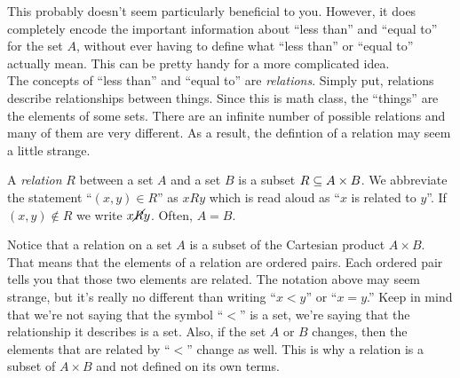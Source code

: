This probably doesn't seem particularly beneficial to you.  However, it does completely encode the important information about ``less than'' and ``equal to'' for the set $A$, without ever having to define what ``less than'' or ``equal to'' actually mean.  This can be pretty handy for a more complicated idea.\\

The concepts of ``less than'' and ``equal to'' are \textit{relations}.  Simply put, relations describe relationships between things.  Since this is math class, the ``things'' are the elements of some sets.  There are an infinite number of possible relations and many of them are very different.  As a result, the defintion of a relation may seem a little strange.

\begin{definition}[Relation]  A \textit{relation} $R$ between a set $A$ and a set $B$ is a subset $R \subseteq A \times B$.  We abbreviate the statement ``$(x,y) \in R$'' as $x R y$ which is read aloud as ``$x$ is related to $y$''.  If $(x,y) \notin R$ we write $x \cancel{R} y$.  Often, $A=B$.
\end{definition}

Notice that a relation on a set $A$ is a subset of the Cartesian product $A \times B$.  That means that the elements of a relation are ordered pairs.  Each ordered pair tells you that those two elements are related.  The notation above may seem strange, but it's really no different than writing ``$x<y$'' or ``$x=y$.''  Keep in mind that we're not saying that the symbol ``$<$'' is a set, we're saying that the relationship it describes is a set.  Also, if the set $A$ or $B$ changes, then the elements that are related by ``$<$'' change as well.  This is why a relation is a subset of $A \times B$ and not defined on its own terms.

